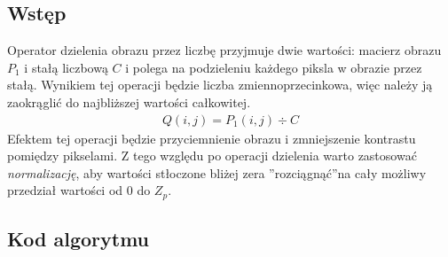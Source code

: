 \documentclass[a4paper,12pt]{book}
\begin{document}
\subsection*{Wstęp}
Operator dzielenia obrazu przez liczbę przyjmuje dwie wartości: macierz obrazu $P_1$ i stałą liczbową $C$ i polega na podzieleniu każdego piksla w obrazie przez stałą. Wynikiem tej operacji będzie liczba zmiennoprzecinkowa, więc należy ją zaokrąglić do najbliższej wartości całkowitej. 
\begin{gather}
	Q(i,j) = P_1(i,j) \div C
\end{gather}
Efektem tej operacji będzie przyciemnienie obrazu i zmniejszenie kontrastu pomiędzy pikselami. Z tego względu po operacji dzielenia warto zastosować \textit{normalizację}, aby wartości stłoczone bliżej zera \textquotedblright rozciągnąć\textquotedblright na cały możliwy przedział wartości od $0$ do $Z_p$. 

\subsection*{Kod algorytmu}
\end{document}
